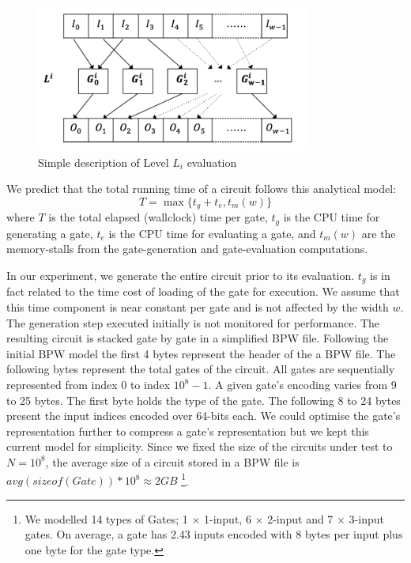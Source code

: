 \par
\begin{figure}[h]
	\center
	\includegraphics[width=0.8\textwidth]{img/level.png}
	\caption{Simple description of Level $L_i$ evaluation}
\end{figure}
\par
We predict that the total running time of a circuit follows this analytical model:
\begin{equation}
T = \max\{ t_g + t_e, t_m(w) \}
\end{equation}
where $T$ is the total elapsed (wallclock) time per gate, $t_g$ is the CPU time for generating a gate, $t_e$ is the CPU time for evaluating a gate, and $t_m(w)$ are the memory-stalls from the gate-generation and gate-evaluation computations.
\par
In our experiment, we generate the entire circuit prior to its evaluation. $t_g$ is in fact related to the time cost of loading of the gate for execution. We assume that this time component is near constant per gate and is not affected by the width $w$. The generation step executed initially is not monitored for performance. The resulting circuit is stacked gate by gate in a simplified BPW file. Following the initial BPW model the first 4 bytes represent the header of the a BPW file\cite{clark}. The following bytes represent the total gates of the circuit. All gates are sequentially represented from index $0$ to index $10^8-1$. A given gate's encoding varies from 9 to 25 bytes. The first byte holds the type of the gate. The following 8 to 24 bytes present the input indices encoded over 64-bits each. We could optimise the gate's representation further to compress a gate's representation but we kept this current model for simplicity. Since we fixed the size of the circuits under test to $N = 10^8$, the average size of a circuit stored in a BPW file is $avg(sizeof(Gate)) * 10^8 \approx 2 GB$ \footnote{We modelled 14 types of Gates; 1 $\times$ 1-input, 6 $\times$ 2-input and 7 $\times$ 3-input gates. On average, a gate has 2.43 inputs encoded with 8 bytes per input plus one byte for the gate type.}.
